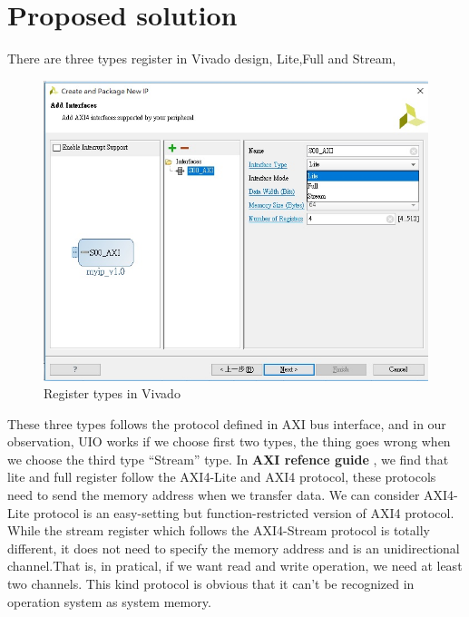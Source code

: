 
\chapter{Proposed solution }
\label{cha:proposed solution }
There are three types register in Vivado design, Lite,Full and Stream, 

\begin{figure}[!htb]
  \centering
  \includegraphics[scale=0.7]{images/register_type.jpg}
  \caption[Register types in Vivado]{Register types in Vivado}
  \label{fig:Register types in Vivado}
\end{figure}

These three types follows the protocol defined in AXI bus interface, and in our observation, UIO works if we choose first two types, the thing goes wrong when we choose the third type ``Stream'' type. In \textbf{AXI refence guide} \cite{axiref}, we find that lite and full register follow the AXI4-Lite and AXI4 protocol, these protocols need to send the memory address when we transfer data. We can consider AXI4-Lite protocol is an easy-setting but function-restricted version of AXI4 protocol. While the stream register which follows the AXI4-Stream protocol is totally different, it does not need to specify the memory address and is an unidirectional channel.That is, in pratical, if we want read and write operation, we need at least two channels. This kind protocol is obvious that it can't be recognized in operation system as system memory.


